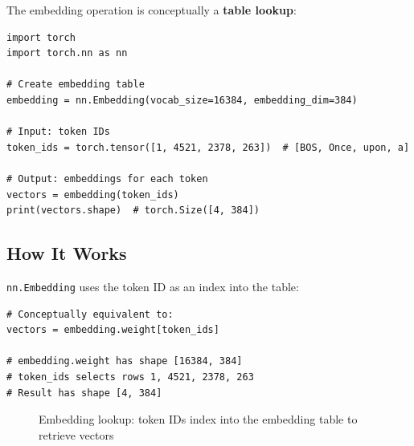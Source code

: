 The embedding operation is conceptually a \textbf{table lookup}:

\begin{lstlisting}[style=python]
import torch
import torch.nn as nn

# Create embedding table
embedding = nn.Embedding(vocab_size=16384, embedding_dim=384)

# Input: token IDs
token_ids = torch.tensor([1, 4521, 2378, 263])  # [BOS, Once, upon, a]

# Output: embeddings for each token
vectors = embedding(token_ids)
print(vectors.shape)  # torch.Size([4, 384])
\end{lstlisting}

\subsection{How It Works}

\texttt{nn.Embedding} uses the token ID as an index into the table:

\begin{lstlisting}[style=python]
# Conceptually equivalent to:
vectors = embedding.weight[token_ids]

# embedding.weight has shape [16384, 384]
# token_ids selects rows 1, 4521, 2378, 263
# Result has shape [4, 384]
\end{lstlisting}

\begin{figure}[H]
\centering
{}
\caption{Embedding lookup: token IDs index into the embedding table to retrieve vectors}
\label{fig:embedding-lookup}
\end{figure}

